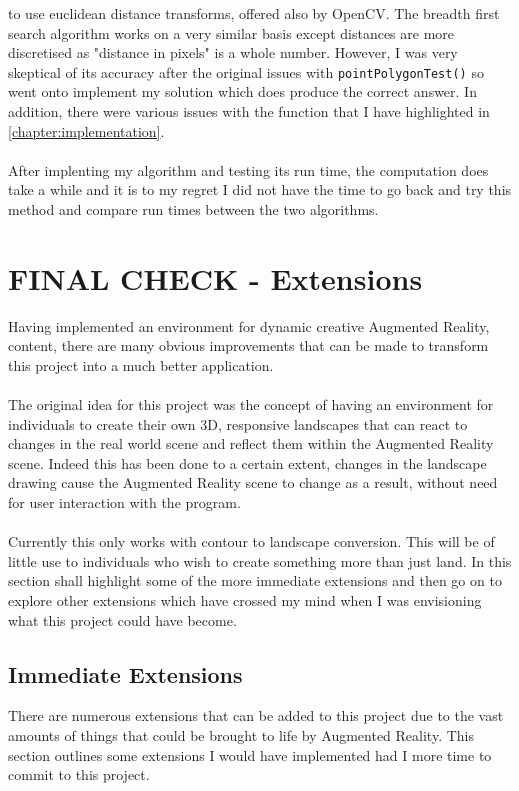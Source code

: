\documentclass[11pt]{article}
\begin{document}
to use euclidean distance transforms, offered also by OpenCV. The breadth
first search algorithm works on a very similar basis except distances
are more discretised as "distance in pixels" is a whole number. However,
I was very skeptical of its accuracy after the original issues with
\texttt{pointPolygonTest()} so went onto implement my solution which does produce
the correct answer. In addition, there were various issues with the function
that I have highlighted in \ref{chapter:implementation}. \\
\\
After implenting my algorithm and testing its run time,
the computation does take a while and it is
to my regret I did not have the time to go back and try this method and
compare run times between the two algorithms.

\section{FINAL CHECK - Extensions}
\label{chapter:extensions}
Having implemented an environment for dynamic creative Augmented Reality,
content, there are many obvious improvements that can be made to transform 
this project into a much better application. \\
\\
The original idea for this project was the concept of having an environment
for individuals to create their own 3D, responsive landscapes that can react
to changes in the real world scene and reflect them within the Augmented Reality scene. Indeed
this has been done to a certain extent, changes in the landscape drawing cause
the Augmented Reality scene to change as a result, without need for user interaction with the
program.\\
\\
Currently this only works with contour to landscape conversion. This
will be of little use to individuals who wish to create something more 
than just land. In this section shall highlight some of the more 
immediate extensions and then go on to explore other extensions 
which have crossed my mind when I was envisioning what 
this project could have become.

\subsection{Immediate Extensions}
There are numerous extensions that can be added to this project due to the 
vast amounts of things that could be brought to life by Augmented Reality.
This section outlines some extensions I would have implemented had I
more time to commit to this project.
\end{document}

